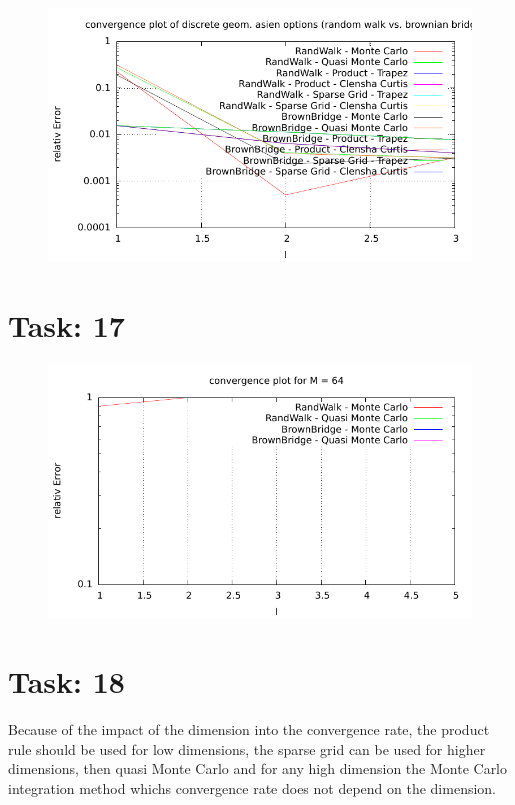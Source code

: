 \documentclass{article}
\begin{document}
\begin{figure}[htbp]
  \centering
     \includegraphics[width=1.0\textwidth]{../Task16/sh3_task16_convergence_plot.pdf}
\end{figure}

\section*{Task: 17}

\begin{figure}[htbp]
  \centering
     \includegraphics[width=1.0\textwidth]{../Task17/sh3_task17_convergencePlot.pdf}
\end{figure}

\newpage

\section*{Task: 18}

Because of the impact of the dimension into the convergence rate, 
the product rule should be used for low dimensions, 
the sparse grid can be used for higher dimensions, then quasi Monte Carlo and
for any high dimension the Monte Carlo integration method whichs convergence rate does not depend on the dimension. 
\end{document}
